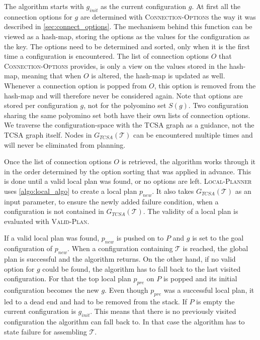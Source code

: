 The algorithm starts with $g_{init}$ as the current configuration $g$.
At first all the connection options for $g$ are determined with {\scshape Connection-Options} the way it was described in \autoref{sec:connect_options}.
The mechanisem behind this function can be viewed as a hash-map, storing the options as the values for the configuration as the key.
The options need to be determined and sorted, only when it is the first time a configuration is encountered.
The list of connection options $O$ that {\scshape Connection-Options} provides, is only a view on the values stored in the hash-map, meaning that when $O$ is altered, the hash-map is updated as well.
Whenever a connection option is popped from $O$, this option is removed from the hash-map and will therefore never be considered again.
Note that options are stored per configuration $g$, not for the polyomino set $S(g)$.
Two configuration sharing the same polyomino set both have their own lists of connection options.
We traverse the configuration-space with the TCSA graph as a guidance, not the TCSA graph itself.
Nodes in $G_{\textit{TCSA}}(\mathcal{T})$ can be encountered multiple times and will never be eliminated from planning.

Once the list of connection options $O$ is retrieved, the algorithm works through it in the order determined by the option sorting that was applied in advance.
This is done until a valid local plan was found, or no options are left.
{\scshape Local-Planner} uses \autoref{algo:local_algo} to create a local plan $p_{new}$.
It also takes $G_{\textit{TCSA}}(\mathcal{T})$ as an input parameter, to ensure the newly added failure condition, when a configuration is not contained in $G_{\textit{TCSA}}(\mathcal{T})$.
The validity of a local plan is evaluated with {\scshape Valid-Plan}.

If a valid local plan was found, $p_{new}$ is pushed on to $P$ and $g$ is set to the goal configuration of $p_{new}$.
When a configuration containing $\mathcal{T}$ is reached, the global plan is successful and the algorithm returns.
On the other hand, if no valid option for $g$ could be found, the algorithm has to fall back to the last visited configuration.
For that the top local plan $p_{pre}$ on $P$ is popped and its initial configuration becomes the new $g$.
Even though $p_{pre}$ was a successful local plan, it led to a dead end and had to be removed from the stack.
If $P$ is empty the current configuration is $g_{init}$.
This means that there is no previously visited configuration the algorithm can fall back to.
In that case the algorithm has to state failure for assembling $\mathcal{T}$.


